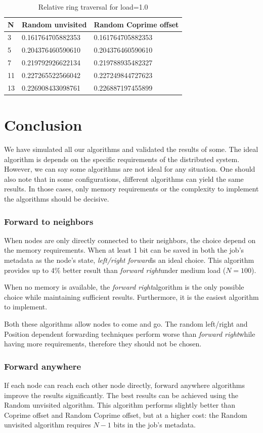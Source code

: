 \documentclass[10pt,a4paper]{article}
\newcommand{\FR}{\textit{forward right\xspace}}
\newcommand{\LRF}{\textit{left/right forward\xspace}}
\begin{document}
\begin{table}[h!]
\centering
\begin{tabular}{|l|l|l|} \hline
N	& Random unvisited	& Random Coprime offset \\ \hline
3	&   0.161764705882353 &  0.161764705882353 \\
5	&   0.204376460590610 &  0.204376460590610 \\
7	&   0.219792926622134 &  0.219788935482327 \\
11	&   0.227265522566042 &  0.227249844727623 \\
13	&   0.226908433098761 &  0.226887197455899 \\ \hline
\end{tabular}
\caption{Relative ring traversal for load=1.0}
\end{table}

\section{Conclusion}
\label{secconclusion}

We have simulated all our algorithms and validated the results of some. The ideal algorithm is depends on the specific requirements of the distributed system. However, we can say some algorithms are not ideal for any situation. One should also note that in some configurations, different algorithms can yield the same results. In those cases, only memory requirements or the complexity to implement the algorithms should be decisive.

\subsubsection*{Forward to neighbors}
When nodes are only directly connected to their neighbors, the choice depend on the memory requirements. When at least 1 bit can be saved in both the job's metadata as the node's state, \LRF is an ideal choice. This algorithm provides up to 4\% better result than \FR under medium load ($N=100$).

When no memory is available, the \FR algorithm is the only possible choice while maintaining sufficient results. Furthermore, it is the easiest algorithm to implement.

Both these algorithms allow nodes to come and go. The random left/right and Position dependent forwarding techniques perform worse than \FR while having more requirements, therefore they should not be chosen.

\subsubsection*{Forward anywhere}
If each node can reach each other node directly, forward anywhere algorithms improve the results significantly. The best results can be achieved using the Random unvisited algorithm. This algorithm performs slightly better than Coprime offset and Random Coprime offset, but at a higher cost: the Random unvisited algorithm requires $N-1$ bits in the job's metadata.
\end{document}
